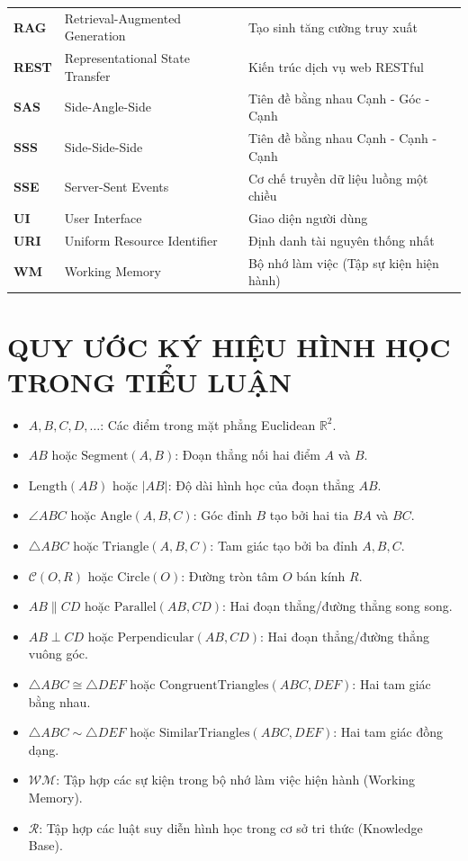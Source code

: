 \begin{table}[h!]
\begin{tabular}{lll}
\textbf{RAG} & Retrieval-Augmented Generation & Tạo sinh tăng cường truy xuất \\
\textbf{REST} & Representational State Transfer & Kiến trúc dịch vụ web RESTful \\
\textbf{SAS} & Side-Angle-Side & Tiên đề bằng nhau Cạnh - Góc - Cạnh \\
\textbf{SSS} & Side-Side-Side & Tiên đề bằng nhau Cạnh - Cạnh - Cạnh \\
\textbf{SSE} & Server-Sent Events & Cơ chế truyền dữ liệu luồng một chiều \\
\textbf{UI} & User Interface & Giao diện người dùng \\
\textbf{URI} & Uniform Resource Identifier & Định danh tài nguyên thống nhất \\
\textbf{WM} & Working Memory & Bộ nhớ làm việc (Tập sự kiện hiện hành) \\
\bottomrule
\end{tabular}
\end{table}

\vspace{0.8cm}

\section*{QUY ƯỚC KÝ HIỆU HÌNH HỌC TRONG TIỂU LUẬN}
\begin{itemize}
    \item $A, B, C, D, \dots$: Các điểm trong mặt phẳng Euclidean $\mathbb{R}^2$.
    \item $AB$ hoặc $\text{Segment}(A, B)$: Đoạn thẳng nối hai điểm $A$ và $B$.
    \item $\text{Length}(AB)$ hoặc $|AB|$: Độ dài hình học của đoạn thẳng $AB$.
    \item $\angle ABC$ hoặc $\text{Angle}(A, B, C)$: Góc đỉnh $B$ tạo bởi hai tia $BA$ và $BC$.
    \item $\triangle ABC$ hoặc $\text{Triangle}(A, B, C)$: Tam giác tạo bởi ba đỉnh $A, B, C$.
    \item $\mathcal{C}(O, R)$ hoặc $\text{Circle}(O)$: Đường tròn tâm $O$ bán kính $R$.
    \item $AB \parallel CD$ hoặc $\text{Parallel}(AB, CD)$: Hai đoạn thẳng/đường thẳng song song.
    \item $AB \perp CD$ hoặc $\text{Perpendicular}(AB, CD)$: Hai đoạn thẳng/đường thẳng vuông góc.
    \item $\triangle ABC \cong \triangle DEF$ hoặc $\text{CongruentTriangles}(ABC, DEF)$: Hai tam giác bằng nhau.
    \item $\triangle ABC \sim \triangle DEF$ hoặc $\text{SimilarTriangles}(ABC, DEF)$: Hai tam giác đồng dạng.
    \item $\mathcal{WM}$: Tập hợp các sự kiện trong bộ nhớ làm việc hiện hành (Working Memory).
    \item $\mathcal{R}$: Tập hợp các luật suy diễn hình học trong cơ sở tri thức (Knowledge Base).
\end{itemize}
